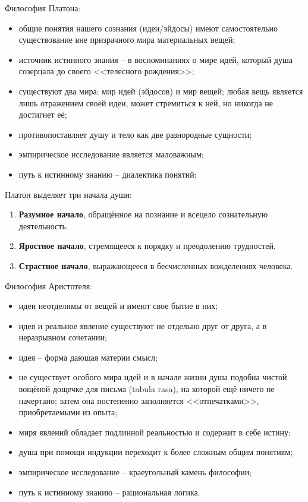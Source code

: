 
Философия Платона:
\begin{itemize}
    \item общие понятия нашего сознания (идеи/эйдосы) имеют самостоятельно существование вне призрачного мира 
        материальных вещей;
    \item источник истинного знания -- в воспоминаниях о мире идей, который душа созерцала до своего 
        <<телесного рождения>>;
    \item существуют два мира: мир идей (эйдосов) и мир вещей; любая вещь является лишь отражением своей 
        идеи, может стремиться к ней, но никогда не достигнет её;
    \item противопоставляет душу и тело как две разнородные сущности;
    \item эмпирическое исследование является маловажным;
    \item путь к истинному знанию -- диалектика понятий;
\end{itemize}

Платон выделяет три начала души:
\begin{enumerate}
    \item \textbf{Разумное начало}, обращённое на познание и всецело сознательную деятельность.
    \item \textbf{Яростное начало}, стремящееся к порядку и преодолению трудностей.
    \item \textbf{Страстное начало}, выражающееся в бесчисленных вожделениях человека.
\end{enumerate}

Философия Аристотеля:
\begin{itemize}
    \item идеи неотделимы от вещей и имеют свое бытие в них;
    \item идея и реальное явление существуют не отдельно друг от друга, а в неразрывном сочетании;
    \item идея -- форма дающая материи смысл;
    \item не существует особого мира идей и в начале жизни душа подобна чистой вощёной дощечке для письма 
        (tabula rasa), на которой ещё ничего не начертано; затем она постепенно заполняется <<отпечатками>>, 
        приобретаемыми из опыта;
    \item миря явлений обладает подлинной реальностью и содержит в себе истину;
    \item душа при помощи индукции переходит к более сложным общим понятиям;
    \item эмпирическое исследование -- краеугольный камень философии;
    \item путь к истинному знанию -- рациональная логика.
\end{itemize}


